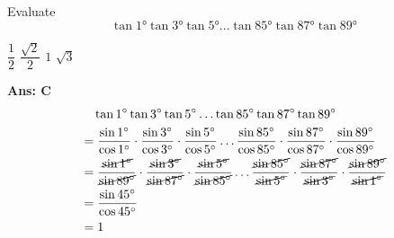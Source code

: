 \documentclass[varwidth=85mm]{standalone}
\begin{document}
Evaluate $$\tan\ang{1}\tan\ang{3}\tan\ang{5}\ldots\tan\ang{85}\tan\ang{87}\tan\ang{89}$$
\begin{choices}
\choice $\dfrac{1}{2}$
\choice $\dfrac{\sqrt{2}}{2}$
\choice $1$%
\choice $\sqrt{3}$
\end{choices}

\begin{answer}
\hrulefill\par
\textbf{Ans: C}
\begin{equation*}
\begin{aligned}
&\quad\tan\ang{1}\tan\ang{3}\tan\ang{5}\ldots\tan\ang{85}\tan\ang{87}\tan\ang{89} \\
&= \frac{\sin\ang{1}}{\cos\ang{1}}\cdot\frac{\sin\ang{3}}{\cos\ang{3}}\cdot\frac{\sin\ang{5}}{\cos\ang{5}}\ldots\frac{\sin\ang{85}}{\cos\ang{85}}\cdot\frac{\sin\ang{87}}{\cos\ang{87}}\cdot\frac{\sin\ang{89}}{\cos\ang{89}} \\
&= \frac{\cancel{\sin\ang{1}}}{\cancel{\sin\ang{89}}}\cdot\frac{\cancel{\sin\ang{3}}}{\cancel{\sin\ang{87}}}\cdot\frac{\cancel{\sin\ang{5}}}{\cancel{\sin\ang{85}}}\ldots\frac{\cancel{\sin\ang{85}}}{\cancel{\sin\ang{5}}}\cdot\frac{\cancel{\sin\ang{87}}}{\cancel{\sin\ang{3}}}\cdot\frac{\cancel{\sin\ang{89}}}{\cancel{\sin\ang{1}}} \\
&= \frac{\sin\ang{45}}{\cos\ang{45}} \\
&= 1
\end{aligned}
\end{equation*}
\end{answer}
\end{document}
